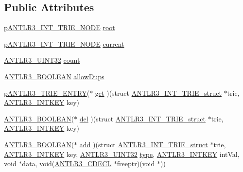 \subsection*{Public Attributes}
\begin{DoxyCompactItemize}
\item 
\hyperlink{antlr3collections_8h_aef3c074a581067c000b7bfc7d6583ffe}{p\-A\-N\-T\-L\-R3\-\_\-\-I\-N\-T\-\_\-\-T\-R\-I\-E\-\_\-\-N\-O\-D\-E} \hyperlink{struct_a_n_t_l_r3___i_n_t___t_r_i_e__struct_ae7c1c1e19fcf28e1d0f8da5f943841b1}{root}
\item 
\hyperlink{antlr3collections_8h_aef3c074a581067c000b7bfc7d6583ffe}{p\-A\-N\-T\-L\-R3\-\_\-\-I\-N\-T\-\_\-\-T\-R\-I\-E\-\_\-\-N\-O\-D\-E} \hyperlink{struct_a_n_t_l_r3___i_n_t___t_r_i_e__struct_a469e642f2944318be753d376a2f06df5}{current}
\item 
\hyperlink{antlr3defs_8h_ac41f744abd0fd25144b9eb9d11b1dfd1}{A\-N\-T\-L\-R3\-\_\-\-U\-I\-N\-T32} \hyperlink{struct_a_n_t_l_r3___i_n_t___t_r_i_e__struct_a12f22c02c75c18d6ce9b8c3d51fa11b3}{count}
\item 
\hyperlink{antlr3defs_8h_a5b33dccbba3b7212539695e21df4079b}{A\-N\-T\-L\-R3\-\_\-\-B\-O\-O\-L\-E\-A\-N} \hyperlink{struct_a_n_t_l_r3___i_n_t___t_r_i_e__struct_a8661863d575caee29c09ee9ef82591b7}{allow\-Dups}
\item 
\hyperlink{antlr3collections_8h_a6e433c54e4d176e8656a00707a35a384}{p\-A\-N\-T\-L\-R3\-\_\-\-T\-R\-I\-E\-\_\-\-E\-N\-T\-R\-Y}($\ast$ \hyperlink{struct_a_n_t_l_r3___i_n_t___t_r_i_e__struct_a9c352f4919e25cbb65316887519952e0}{get} )(struct \hyperlink{struct_a_n_t_l_r3___i_n_t___t_r_i_e__struct}{A\-N\-T\-L\-R3\-\_\-\-I\-N\-T\-\_\-\-T\-R\-I\-E\-\_\-struct} $\ast$trie, \hyperlink{antlr3defs_8h_aa5533fd558adc28dc2af0039f52324a8}{A\-N\-T\-L\-R3\-\_\-\-I\-N\-T\-K\-E\-Y} key)
\item 
\hyperlink{antlr3defs_8h_a5b33dccbba3b7212539695e21df4079b}{A\-N\-T\-L\-R3\-\_\-\-B\-O\-O\-L\-E\-A\-N}($\ast$ \hyperlink{struct_a_n_t_l_r3___i_n_t___t_r_i_e__struct_a85d2a0c76d3e6edc7ff985a15eecde71}{del} )(struct \hyperlink{struct_a_n_t_l_r3___i_n_t___t_r_i_e__struct}{A\-N\-T\-L\-R3\-\_\-\-I\-N\-T\-\_\-\-T\-R\-I\-E\-\_\-struct} $\ast$trie, \hyperlink{antlr3defs_8h_aa5533fd558adc28dc2af0039f52324a8}{A\-N\-T\-L\-R3\-\_\-\-I\-N\-T\-K\-E\-Y} key)
\item 
\hyperlink{antlr3defs_8h_a5b33dccbba3b7212539695e21df4079b}{A\-N\-T\-L\-R3\-\_\-\-B\-O\-O\-L\-E\-A\-N}($\ast$ \hyperlink{struct_a_n_t_l_r3___i_n_t___t_r_i_e__struct_a2006080214d9c067e52d1e534c7a74f3}{add} )(struct \hyperlink{struct_a_n_t_l_r3___i_n_t___t_r_i_e__struct}{A\-N\-T\-L\-R3\-\_\-\-I\-N\-T\-\_\-\-T\-R\-I\-E\-\_\-struct} $\ast$trie, \hyperlink{antlr3defs_8h_aa5533fd558adc28dc2af0039f52324a8}{A\-N\-T\-L\-R3\-\_\-\-I\-N\-T\-K\-E\-Y} key, \hyperlink{antlr3defs_8h_ac41f744abd0fd25144b9eb9d11b1dfd1}{A\-N\-T\-L\-R3\-\_\-\-U\-I\-N\-T32} \hyperlink{convert2cfg_8m_a2902a7a983ab04c79cae2162ad553481}{type}, \hyperlink{antlr3defs_8h_aa5533fd558adc28dc2af0039f52324a8}{A\-N\-T\-L\-R3\-\_\-\-I\-N\-T\-K\-E\-Y} int\-Val, void $\ast$data, void(\hyperlink{antlr3defs_8h_a91c919dd260a95cc88a0cd9b5c0a11cc}{A\-N\-T\-L\-R3\-\_\-\-C\-D\-E\-C\-L} $\ast$freeptr)(void $\ast$))

\end{DoxyCompactItemize}
